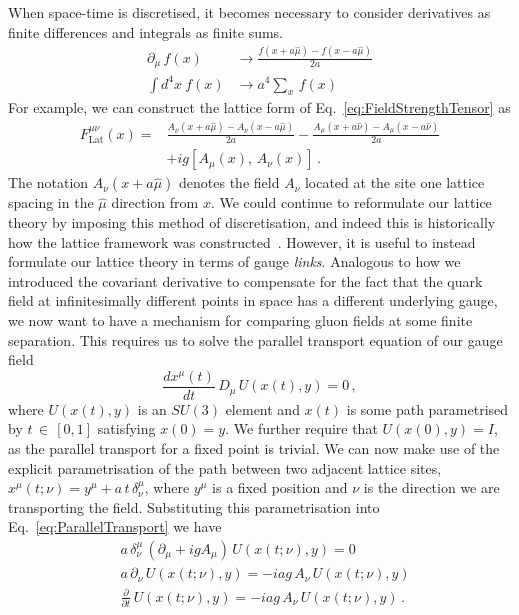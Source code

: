 When space-time is discretised, it becomes necessary to consider derivatives as finite differences and integrals as finite sums.
\begin{align*}
\partial_\mu\,f(x)&\rightarrow \frac{f(x+a\hat{\mu})-f(x-a\hat{\mu})}{2a}\\
\int d^4x~f(x) &\rightarrow a^4\sum_x \,f(x)
\end{align*}
For example, we can construct the lattice form of Eq.~\eqref{eq:FieldStrengthTensor} as
%
\begin{align}
F_{\text{Lat}}^{\mu\nu}(x) = &\frac{A_\nu(x+a\hat{\mu})-A_\nu(x-a\hat{\mu})}{2a}-\frac{A_\mu(x+a\hat{\nu})-A_\mu(x-a\hat{\nu})}{2a}\nonumber\\
&+ig[A_\mu(x),\,A_\nu(x)]\, .
\label{eq:DiscreteFST}
\end{align}
%
The notation $A_\nu(x+a\hat{\mu})$ denotes the field $A_\nu$ located at the site one lattice spacing in the $\hat{\mu}$ direction from $x$. We could continue to reformulate our lattice theory by imposing this method of discretisation, and indeed this is historically how the lattice framework was constructed~\cite{Wilson:1974sk}. However, it is useful to instead formulate our lattice theory in terms of gauge {\it links}. Analogous to how we introduced the covariant derivative to compensate for the fact that the quark field at infinitesimally different points in space has a different underlying gauge, we now want to have a mechanism for comparing gluon fields at some finite separation. This requires us to solve the parallel transport equation of our gauge field~\cite{peskin2018introduction}
%
\begin{equation}
\frac{dx^\mu(t)}{dt}\,D_\mu \,U(x(t),y)=0\, ,
\label{eq:ParallelTransport}
\end{equation}
%
where $U(x(t),y)$ is an $SU(3)$ element and $x(t)$ is some path parametrised by $t\,\in\,[0,1]$ satisfying $x(0)=y$. We further require that $U(x(0),y)=I$, as the parallel transport for a fixed point is trivial. We can now make use of the explicit parametrisation of the path between two adjacent lattice sites, $x^\mu(t;\nu) = y^\mu+a\,t\,\delta_\nu^\mu$, where $y^\mu$ is a fixed position and $\nu$ is the direction we are transporting the field. Substituting this parametrisation into Eq.~\eqref{eq:ParallelTransport} we have
\begin{align*}
&a\, \delta_\nu^\mu\, (\partial_\mu + igA_\mu)\,U(x(t;\nu),y)=0\\
&a\, \partial_\nu\, U(x(t;\nu),y) = -iag\, A_\nu\,U(x(t;\nu),y)\\
&\frac{\partial}{\partial t}\, U(x(t;\nu),y) = -iag\,A_\nu\, U(x(t;\nu),y)\, .
\end{align*}

